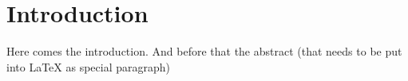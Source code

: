 \section{Introduction}
Here comes the introduction. And before that the abstract (that needs to be put into LaTeX as special paragraph)\newpage %
